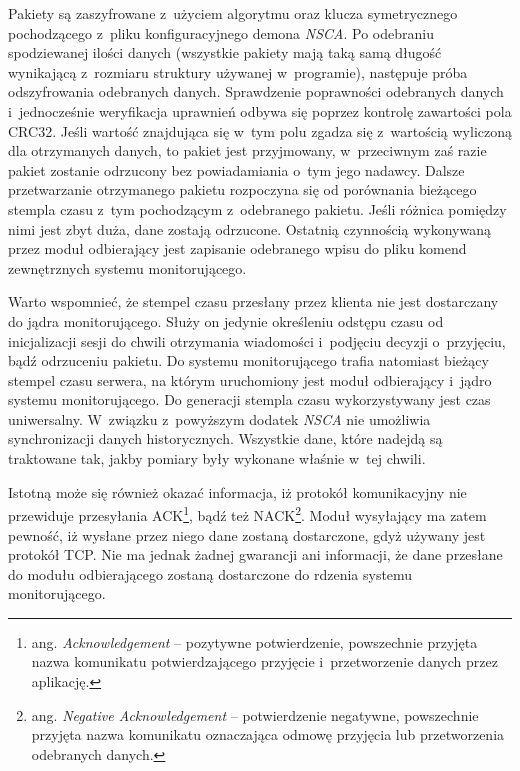 Pakiety są zaszyfrowane z~użyciem algorytmu oraz klucza symetrycznego
pochodzącego z~pliku konfiguracyjnego demona {\em NSCA}. Po odebraniu
spodziewanej ilości danych (wszystkie pakiety mają taką samą długość
wynikającą z~rozmiaru struktury używanej w~programie), następuje próba
odszyfrowania odebranych danych. Sprawdzenie poprawności odebranych
danych i~jednocześnie weryfikacja uprawnień odbywa się poprzez
kontrolę zawartości pola CRC32. Jeśli wartość znajdująca się w~tym
polu zgadza się z~wartością wyliczoną dla otrzymanych danych, to
pakiet jest przyjmowany, w~przeciwnym zaś razie pakiet zostanie
odrzucony bez powiadamiania o~tym jego nadawcy. Dalsze przetwarzanie
otrzymanego pakietu rozpoczyna się od porównania bieżącego stempla
czasu z~tym pochodzącym z~odebranego pakietu. Jeśli różnica pomiędzy
nimi jest zbyt duża, dane zostają odrzucone. Ostatnią czynnością
wykonywaną przez moduł odbierający jest zapisanie odebranego wpisu do
pliku komend zewnętrznych systemu monitorującego.

Warto wspomnieć, że stempel czasu przesłany przez klienta nie jest
dostarczany do jądra monitorującego. Służy on jedynie określeniu
odstępu czasu od inicjalizacji sesji do chwili otrzymania wiadomości
i~podjęciu decyzji o~przyjęciu, bądź odrzuceniu pakietu. Do systemu
monitorującego trafia natomiast bieżący stempel czasu serwera, na
którym uruchomiony jest moduł odbierający i~jądro systemu
monitorującego. Do generacji stempla czasu wykorzystywany jest czas
uniwersalny. W~związku z~powyższym dodatek {\em NSCA} nie umożliwia
synchronizacji danych historycznych. Wszystkie dane, które nadejdą są
traktowane tak, jakby pomiary były wykonane właśnie w~tej chwili.

Istotną może się również okazać informacja, iż protokół komunikacyjny
nie przewiduje przesyłania ACK\footnote {ang. {\em Acknowledgement} --
  pozytywne potwierdzenie, powszechnie przyjęta nazwa komunikatu
  potwierdzającego przyjęcie i~przetworzenie danych przez aplikację.},
bądź też NACK\footnote{ang. {\em Negative Acknowledgement} --
  potwierdzenie negatywne, powszechnie przyjęta nazwa komunikatu
  oznaczająca odmowę przyjęcia lub przetworzenia odebranych
  danych.}. Moduł wysyłający ma zatem pewność, iż wysłane przez niego
dane zostaną dostarczone, gdyż używany jest protokół TCP.  Nie ma
jednak żadnej gwarancji ani informacji, że dane przesłane do modułu
odbierającego zostaną dostarczone do rdzenia systemu monitorującego.

